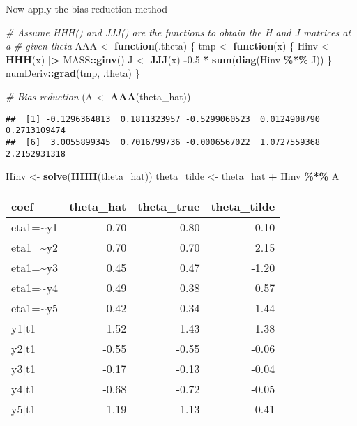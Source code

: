 \documentclass[
]{article}
\newenvironment{Shaded}{\begin{snugshade}}{\end{snugshade}}
\newcommand{\CommentTok}[1]{\textcolor[rgb]{0.56,0.35,0.01}{\textit{#1}}}
\newcommand{\ControlFlowTok}[1]{\textcolor[rgb]{0.13,0.29,0.53}{\textbf{#1}}}
\newcommand{\FloatTok}[1]{\textcolor[rgb]{0.00,0.00,0.81}{#1}}
\newcommand{\FunctionTok}[1]{\textcolor[rgb]{0.13,0.29,0.53}{\textbf{#1}}}
\newcommand{\NormalTok}[1]{#1}
\newcommand{\OtherTok}[1]{\textcolor[rgb]{0.56,0.35,0.01}{#1}}
\newcommand{\SpecialCharTok}[1]{\textcolor[rgb]{0.81,0.36,0.00}{\textbf{#1}}}
\begin{document}
Now apply the bias reduction method

\begin{Shaded}
\begin{Highlighting}[]
\CommentTok{\# Assume HHH() and JJJ() are the functions to obtain the H and J matrices at a}
\CommentTok{\# given theta}
\NormalTok{AAA }\OtherTok{\textless{}{-}} \ControlFlowTok{function}\NormalTok{(.theta) \{}
\NormalTok{  tmp }\OtherTok{\textless{}{-}} \ControlFlowTok{function}\NormalTok{(x) \{}
\NormalTok{    Hinv }\OtherTok{\textless{}{-}} \FunctionTok{HHH}\NormalTok{(x) }\SpecialCharTok{|\textgreater{}}\NormalTok{ MASS}\SpecialCharTok{::}\FunctionTok{ginv}\NormalTok{()}
\NormalTok{    J    }\OtherTok{\textless{}{-}} \FunctionTok{JJJ}\NormalTok{(x)}
    \SpecialCharTok{{-}}\FloatTok{0.5} \SpecialCharTok{*} \FunctionTok{sum}\NormalTok{(}\FunctionTok{diag}\NormalTok{(Hinv }\SpecialCharTok{\%*\%}\NormalTok{ J))}
\NormalTok{  \}}
\NormalTok{  numDeriv}\SpecialCharTok{::}\FunctionTok{grad}\NormalTok{(tmp, .theta)}
\NormalTok{\}}

\CommentTok{\# Bias reduction}
\NormalTok{(A }\OtherTok{\textless{}{-}} \FunctionTok{AAA}\NormalTok{(theta\_hat))}
\end{Highlighting}
\end{Shaded}

\begin{verbatim}
##  [1] -0.1296364813  0.1811323957 -0.5299060523  0.0124908790  0.2713109474
##  [6]  3.0055899345  0.7016799736 -0.0006567022  1.0727559368  2.2152931318
\end{verbatim}

\begin{Shaded}
\begin{Highlighting}[]
\NormalTok{Hinv }\OtherTok{\textless{}{-}} \FunctionTok{solve}\NormalTok{(}\FunctionTok{HHH}\NormalTok{(theta\_hat))}
\NormalTok{theta\_tilde }\OtherTok{\textless{}{-}}\NormalTok{ theta\_hat }\SpecialCharTok{+}\NormalTok{ Hinv }\SpecialCharTok{\%*\%}\NormalTok{ A}
\end{Highlighting}
\end{Shaded}

\begin{tabular}[t]{lrrr}
\toprule
coef & theta\_hat & theta\_true & theta\_tilde\\
\midrule
eta1=\textasciitilde{}y1 & 0.70 & 0.80 & 0.10\\
eta1=\textasciitilde{}y2 & 0.70 & 0.70 & 2.15\\
eta1=\textasciitilde{}y3 & 0.45 & 0.47 & -1.20\\
eta1=\textasciitilde{}y4 & 0.49 & 0.38 & 0.57\\
eta1=\textasciitilde{}y5 & 0.42 & 0.34 & 1.44\\
\addlinespace
y1|t1 & -1.52 & -1.43 & 1.38\\
y2|t1 & -0.55 & -0.55 & -0.06\\
y3|t1 & -0.17 & -0.13 & -0.04\\
y4|t1 & -0.68 & -0.72 & -0.05\\
y5|t1 & -1.19 & -1.13 & 0.41\\
\bottomrule
\end{tabular}
\end{document}
